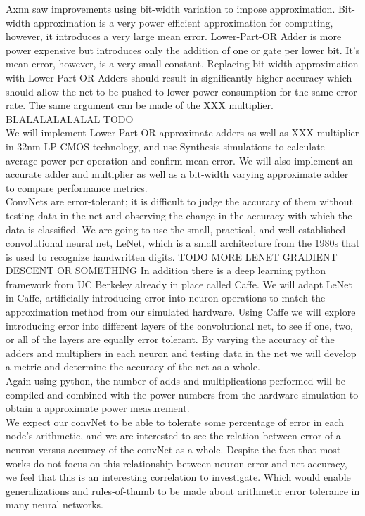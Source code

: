 \documentclass[conference]{IEEEtran}
\begin{document}
	\indent Axnn saw improvements using bit-width variation to impose approximation. Bit-width approximation is a very power efficient approximation for computing, however, it introduces a very large mean error. Lower-Part-OR Adder is more power expensive but introduces only the addition of one or gate per lower bit. It's mean error, however, is a very small constant. Replacing bit-width approximation with Lower-Part-OR Adders should result in significantly higher accuracy which should allow the net to be pushed to lower power consumption for the same error rate. The same argument can be made of the XXX multiplier. BLALALALALALAL TODO\\

	\indent We will implement Lower-Part-OR approximate adders as well as XXX multiplier in 32nm LP CMOS technology, and use Synthesis simulations to calculate average power per operation and confirm mean error. We will also implement an accurate adder and multiplier as well as a  bit-width varying approximate adder to compare performance metrics.\\

	\indent ConvNets are error-tolerant; it is difficult to judge the accuracy of them without testing data in the net and observing the change in  the accuracy with which the data is classified. We are going to use the small, practical, and well-established convolutional neural net, LeNet, which is a small architecture from the 1980s that is used to recognize handwritten digits. TODO MORE LENET GRADIENT DESCENT OR SOMETHING In addition there is a deep learning python framework from UC Berkeley already in place called Caffe. We will adapt LeNet in Caffe, artificially introducing error into neuron operations to match the approximation method from our simulated hardware. Using Caffe we will explore introducing error into different layers of the convolutional net, to see if one, two, or all of the layers are equally error tolerant. By varying the accuracy of the adders and multipliers in each neuron and testing data in the net we will develop a metric and determine the accuracy of the net as a whole.\\

	\indent Again using python, the number of adds and multiplications performed will be compiled and combined with the power numbers from the hardware simulation to obtain a approximate power measurement. \\

	\indent We expect our convNet to be able to tolerate some percentage of error in each node's arithmetic, and we are interested to see the relation between error of a neuron versus accuracy of the convNet as a whole. Despite the fact that most works do not focus on this relationship between neuron error and net accuracy, we feel that this is an interesting correlation to investigate. Which would enable generalizations and rules-of-thumb to be made about arithmetic error tolerance in many neural networks.\\
	
\end{document}
